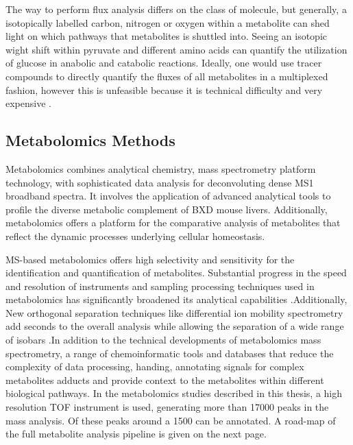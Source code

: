 \documentclass[a4paper]{book}
\begin{document}
	The way to perform flux analysis differs on the class of molecule, but generally, a isotopically labelled carbon, nitrogen or oxygen within a metabolite can shed light on which pathways that metabolites is shuttled into\citep{Zamboni200913C-basedAnalysis}. Seeing an isotopic wight shift within pyruvate and different amino acids can quantify the utilization of glucose in anabolic and catabolic reactions. Ideally, one would use tracer compounds to directly quantify the fluxes of all metabolites in a multiplexed fashion, however this is unfeasible because it is technical difficulty and very expensive \citep{Zamboni200913C-basedAnalysis}. 
	
	
	\subsection{Metabolomics Methods}
	
	Metabolomics combines analytical chemistry, mass spectrometry platform technology, with sophisticated data analysis for deconvoluting dense MS1 broadband spectra. It involves the application of advanced analytical tools to profile the diverse metabolic complement of BXD mouse livers. Additionally, metabolomics offers a platform for the comparative analysis of metabolites that reflect the dynamic processes underlying cellular homeostasis\citep{Aksenov2017GlobalSpectrometry}.
	
	MS-based metabolomics offers high selectivity and sensitivity for the identification and quantification of metabolites. Substantial progress in the speed and resolution of instruments and sampling processing techniques used in metabolomics has significantly broadened its analytical capabilities \citep{Aksenov2017GlobalSpectrometry}.Additionally, New orthogonal separation techniques like differential ion mobility spectrometry add seconds to the overall analysis while allowing the separation of a wide range of isobars \citep{Domalain2014EnantiomericSpectrometry}.In addition to the technical developments of metabolomics mass spectrometry, a range of chemoinformatic tools and databases that reduce the complexity of data processing, handing\citep{Xia2016UsingAnalysis}, annotating signals for complex metabolites adducts and provide context to the metabolites within different biological pathways\citep{Wishart2013HMDB2013,Xia2010MSEA}. In the metabolomics studies described in this thesis, a high resolution TOF instrument is used, generating more than 17000 peaks in the mass analysis. Of these peaks around a 1500 can be annotated. A road-map of the full metabolite analysis pipeline is given on the next page.
	
\end{document}
